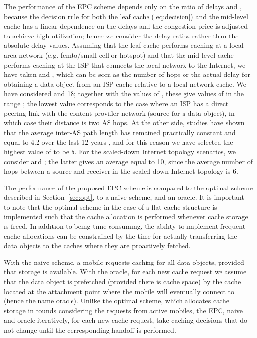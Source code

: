\documentclass[conference]{IEEEtran}
\newcommand{\mynote}[1]{{{\medskip
\footnotesize \em \noindent Note: #1}}\medskip}
\newcommand{\mynotex}[1]{}
\renewcommand{\mynote}[1]{}
\begin{document}
The performance of the EPC scheme depends only on the ratio of delays  and , because the decision rule for both the leaf cache (\ref{eq:decision}) and the mid-level cache has a linear dependence on the delays and the congestion price is adjusted to achieve high utilization; hence we consider the delay ratios rather than the absolute delay values.
Assuming that the leaf cache performs caching at a local area network (e.g.  femto/small cell or hotspot) and that the mid-level cache performs caching at the ISP that connects the local network to the Internet, we have taken   and , which can be seen as the number of hops or the actual delay for obtaining a data object from an ISP cache relative to a local network cache.
We have considered  and 18; together with the values of  , these give values of  in the range ; the lowest value  corresponds to the case where an ISP has a direct peering link with the content provider network (source for a data object), in which case their distance is two AS hops.
At the other side, studies have shown that the average inter-AS path length has remained practically constant and equal to 4.2 over the last 12 years \cite{Dha+11}, and for this reason we have selected the highest value of  to be 5. For the scaled-down Internet topology scenarios, we consider  and ; the latter gives an average   equal to 10, since the average number of hops between a source and receiver in the scaled-down Internet topology is 6.


\mynotex{why we take ratio of delays}

\mynote{XV: how do we define neighborhood}


The performance of the proposed EPC scheme is compared to the optimal scheme described in Section~\ref{sec:opt},  to a naive scheme, and an oracle.
It is important to note that the optimal scheme in the case of a flat cache structure is implemented such that the cache allocation is performed whenever cache storage is freed. In addition to being time consuming, the ability to implement frequent cache allocations can be constrained by the time for actually transferring the data objects to the caches where they are proactively fetched.

With the naive scheme, a mobile requests caching for all data objects, provided that storage is available. With the oracle, for each new cache request we assume that the data object is prefetched (provided there is cache space) by the cache located at  the attachment point where the mobile will eventually connect to (hence the name oracle). Unlike the optimal scheme, which allocates cache storage in rounds considering the requests from active mobiles,  the EPC, naive and oracle iteratively, for each new cache request, take caching decisions that do not change until the corresponding handoff is performed.
\end{document}
